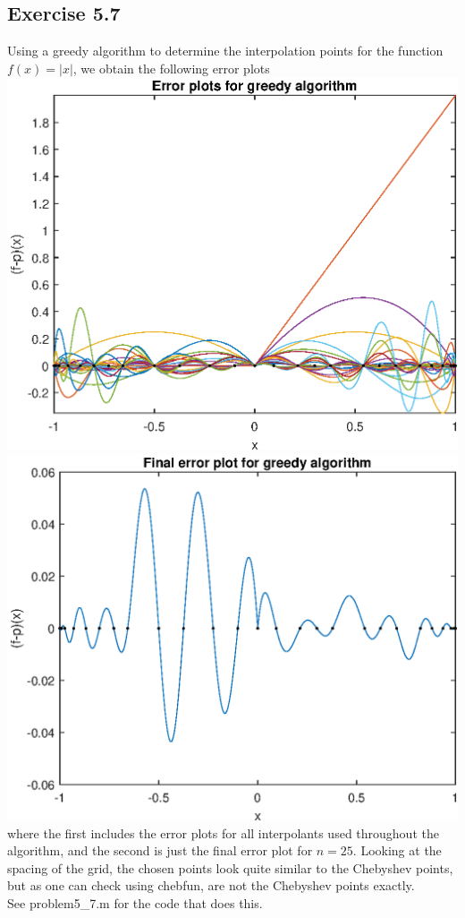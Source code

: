 \documentclass{article}
\begin{document}
\subsection{Exercise 5.7}
Using a greedy algorithm to determine the interpolation points for the function $f(x)=|x|$, we obtain the following error plots\\
\includegraphics[scale=0.7]{prob5-7a.eps}\\
\includegraphics[scale=0.7]{prob5-7b.eps}\\
where the first includes the error plots for all interpolants used throughout the algorithm, and the second is just the final error plot for $n=25$. Looking at the spacing of the grid, the chosen points look quite similar to the Chebyshev points, but as one can check using chebfun, are not the Chebyshev points exactly. \\
See problem5\_7.m for the code that does this.
\end{document}
